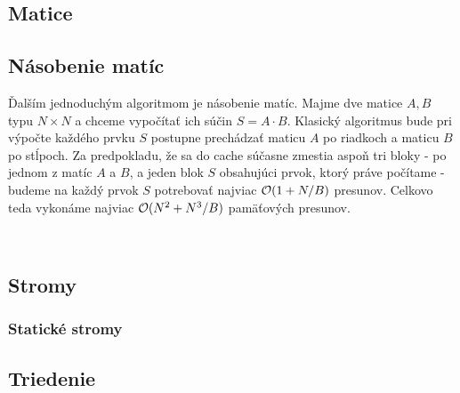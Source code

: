 \documentclass[12pt,a4paper]{article}
\begin{document}
\subsection{Matice}

\subsection{Násobenie matíc}

Ďalším jednoduchým \obliv algoritmom je násobenie matíc. Majme dve matice $A, B$ typu $N \times N$ a chceme vypočítať ich súčin $S = A \cdot B$. Klasický algoritmus bude pri výpočte každého prvku $S$ postupne prechádzať maticu $A$ po riadkoch a maticu $B$ po stĺpoch. Za predpokladu, že sa do cache súčasne zmestia aspoň tri bloky - po jednom z matíc $A$ a $B$, a jeden blok $S$ obsahujúci prvok, ktorý práve počítame - budeme na každý prvok $S$ potrebovať najviac $\mathcal{O}(1+N/B)$ presunov. Celkovo teda vykonáme najviac $\mathcal{O}(N^2 + N^3/B)$ pamäťových presunov. 

\



\subsection{Stromy}
\subsubsection{Statické stromy}




\subsection{Triedenie}
\end{document}
